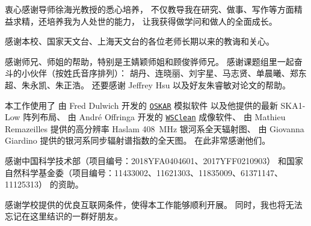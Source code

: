 
\begin{thanks}

衷心感谢导师徐海光教授的悉心培养，
不仅教导我在研究、做事、写作等方面精益求精，还培养我为人处世的能力，
让我获得做学问和做人的全面成长。

感谢本校、国家天文台、上海天文台的各位老师长期以来的教诲和关心。

感谢师兄、师姐的帮助，特别是王婧颖师姐和顾俊骅师兄。
感谢课题组里一起奋斗的小伙伴（按姓氏音序排列）：
胡丹、连晓丽、刘宇星、马志贤、单晨曦、郑东超、朱永凯、朱正浩。
还要感谢 Jeffrey Hsu 以及好友朱睿敏对论文的帮助。

本工作使用了
由 Fred Dulwich 开发的
\href{https://github.com/OxfordSKA/OSKAR}{\texttt{OSKAR}} 模拟软件
以及他提供的最新 SKA1-Low 阵列布局、
由 André Offringa 开发的
\href{https://sourceforge.net/projects/wsclean/}{\texttt{WSClean}} 成像软件、
由 Mathieu Remazeilles 提供的高分辨率 Haslam \SI{408}{\MHz} 银河系全天辐射图、
由 Giovanna Giardino 提供的银河系同步辐射谱指数的全天图。
在此非常感谢他们。

感谢中国科学技术部（项目编号：2018YFA0404601、2017YFF0210903）
和国家自然科学基金委（项目编号：11433002、11621303、11835009、61371147、11125313）
的资助。

感谢学校提供的优良互联网条件，使得本工作能够顺利开展。
同时，我也将无法忘记在这里结识的一群好朋友。


\end{thanks}

